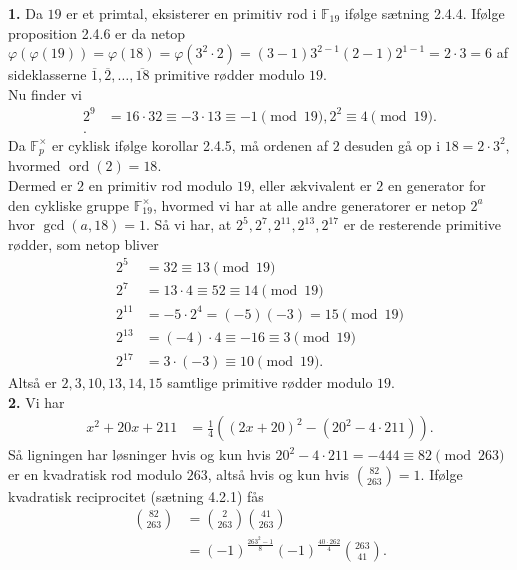 \documentclass[a4paper]{article}
\DeclareMathOperator{\ord}{ord}
\begin{document}
\textbf{1.} Da $19$ er et primtal, eksisterer en primitiv rod
i $\mathbb{F}_{19}$ ifølge sætning 2.4.4. Ifølge proposition 2.4.6 er da netop
$\varphi \left( \varphi (19) \right) = \varphi \left( 18 \right) =
\varphi (3^2 \cdot 2) = (3-1) 3^{2-1} (2-1) 2^{1-1}= 2 \cdot 3 = 6$ af
sideklasserne  $\overline{1}, \overline{2}, \ldots, \overline{18}$ primitive rødder modulo
$19$.\\
Nu finder vi
\begin{align*}
    2^{9} &= 16 \cdot 32 \equiv -3 \cdot 13 \equiv -1 \pmod{19}, 2^2 \equiv
    4 \pmod{19}.\\
.\end{align*}
Da $\mathbb{F}_{p}^{\times }$ er cyklisk ifølge korollar 2.4.5, må ordenen af
$2$ desuden gå op i $18= 2\cdot 3^2$, hvormed $\ord(2) = 18$.\\
\linebreak
Dermed er $2$ en primitiv rod modulo $19$, eller ækvivalent er $2$ en generator
for den cykliske gruppe $\mathbb{F}_{19}^{\times }$, hvormed vi har at alle andre
generatorer er netop $2^{a}$ hvor $\gcd(a,18)=1$. Så vi har, at
$2^{5}, 2^{7}, 2^{11}, 2^{13}, 2^{17}$ er de resterende primitive rødder, som
netop bliver
\begin{align*}
    2^{5} &= 32 \equiv 13 \pmod{19}\\
    2^{7} &= 13 \cdot 4 \equiv 52 \equiv 14 \pmod{19}\\
    2^{11} &= -5 \cdot 2^{4} = (-5) (-3) = 15 \pmod{19}\\
    2^{13} &= (-4) \cdot 4 \equiv -16 \equiv 3 \pmod{19}\\
    2^{17} &= 3 \cdot (-3) \equiv 10 \pmod{19}
.\end{align*}
Altså er $2,3,10,13,14,15$ samtlige primitive rødder modulo $19$.\\
\linebreak
\textbf{2.} Vi har
\begin{align*}
    x^2 + 20x + 211 
    &= \frac{1}{4} \left( \left( 2x+20 \right)^2 - \left( 20^2 - 4 \cdot 211 \right)  \right) 
.\end{align*}
Så ligningen har løsninger hvis og kun hvis
$20^2 - 4\cdot 211 = -444 \equiv 82 \pmod{263}$ er en kvadratisk rod modulo
$263$, altså hvis og kun hvis $\binom{82}{263} = 1$. Ifølge kvadratisk
reciprocitet (sætning 4.2.1) fås
\begin{align*}
    \binom{82}{263}
    &= \binom{2}{263} \binom{41}{263}\\
    &= (-1)^{\frac{263^2 -1}{8}} \left( -1 \right)^{\frac{40 \cdot 262}{4}}
    \binom {263}{41}
.\end{align*}
\end{document}
